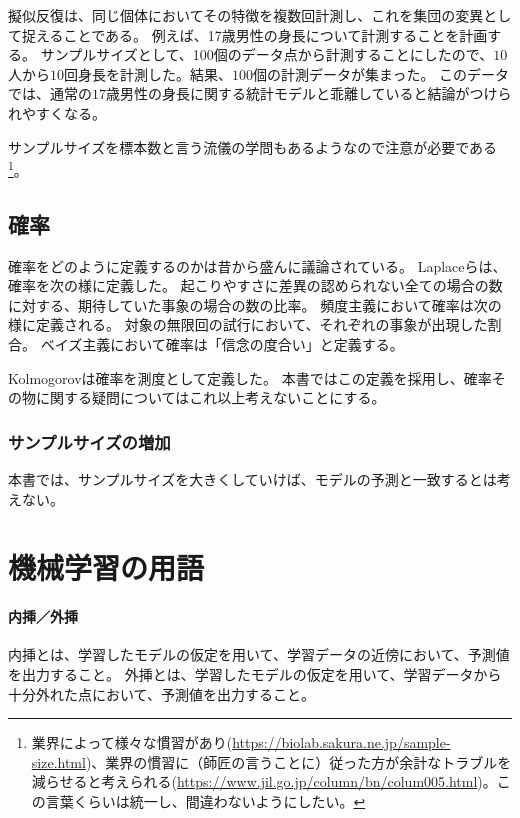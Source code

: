 擬似反復は、同じ個体においてその特徴を複数回計測し、これを集団の変異として捉えることである。
例えば、17歳男性の身長について計測することを計画する。
サンプルサイズとして、100個のデータ点から計測することにしたので、$10$人から$10$回身長を計測した。結果、$100$個の計測データが集まった。
このデータでは、通常の$17$歳男性の身長に関する統計モデルと乖離していると結論がつけられやすくなる。



サンプルサイズを標本数と言う流儀の学問もあるようなので注意が必要である
\footnote{業界によって様々な慣習があり(\url{https://biolab.sakura.ne.jp/sample-size.html})、業界の慣習に（師匠の言うことに）従った方が余計なトラブルを減らせると考えられる(\url{https://www.jil.go.jp/column/bn/colum005.html})。この言葉くらいは統一し、間違わないようにしたい。}。


\subsection{確率}
確率をどのように定義するのかは昔から盛んに議論されている。
Laplaceらは、確率を次の様に定義した。
起こりやすさに差異の認められない全ての場合の数に対する、期待していた事象の場合の数の比率。
頻度主義において確率は次の様に定義される。
対象の無限回の試行において、それぞれの事象が出現した割合。
ベイズ主義において確率は「信念の度合い」と定義する。

Kolmogorovは確率を測度として定義した。
本書ではこの定義を採用し、確率その物に関する疑問についてはこれ以上考えないことにする。

\subsubsection{サンプルサイズの増加}
本書では、サンプルサイズを大きくしていけば、モデルの予測と一致するとは考えない。

\section{機械学習の用語}


\paragraph{内挿／外挿}
内挿とは、学習したモデルの仮定を用いて、学習データの近傍において、予測値を出力すること。
外挿とは、学習したモデルの仮定を用いて、学習データから十分外れた点において、予測値を出力すること。

